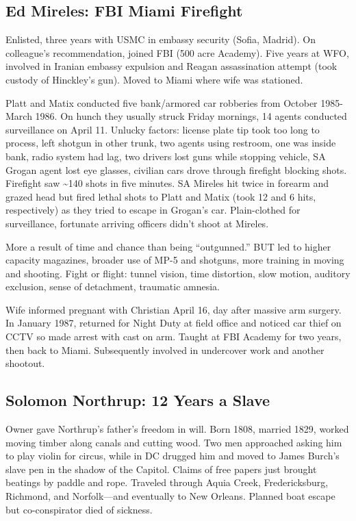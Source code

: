 \documentclass[
]{article}
\begin{document}
\hypertarget{ed-mireles-fbi-miami-firefight}{%
\subsection{Ed Mireles: FBI Miami
Firefight}\label{ed-mireles-fbi-miami-firefight}}

Enlisted, three years with USMC in embassy security (Sofia, Madrid). On
colleague's recommendation, joined FBI (500 acre Academy). Five years at
WFO, involved in Iranian embassy expulsion and Reagan assassination
attempt (took custody of Hinckley's gun). Moved to Miami where wife was
stationed.

Platt and Matix conducted five bank/armored car robberies from October
1985-March 1986. On hunch they usually struck Friday mornings, 14 agents
conducted surveillance on April 11. Unlucky factors: license plate tip
took too long to process, left shotgun in other trunk, two agents using
restroom, one was inside bank, radio system had lag, two drivers lost
guns while stopping vehicle, SA Grogan agent lost eye glasses, civilian
cars drove through firefight blocking shots. Firefight saw
\textasciitilde140 shots in five minutes. SA Mireles hit twice in
forearm and grazed head but fired lethal shots to Platt and Matix (took
12 and 6 hits, respectively) as they tried to escape in Grogan's car.
Plain-clothed for surveillance, fortunate arriving officers didn't shoot
at Mireles.

More a result of time and chance than being ``outgunned.'' BUT led to
higher capacity magazines, broader use of MP-5 and shotguns, more
training in moving and shooting. Fight or flight: tunnel vision, time
distortion, slow motion, auditory exclusion, sense of detachment,
traumatic amnesia.

Wife informed pregnant with Christian April 16, day after massive arm
surgery. In January 1987, returned for Night Duty at field office and
noticed car thief on CCTV so made arrest with cast on arm. Taught at FBI
Academy for two years, then back to Miami. Subsequently involved in
undercover work and another shootout.

\hypertarget{solomon-northrup-12-years-a-slave}{%
\subsection{Solomon Northrup: 12 Years a
Slave}\label{solomon-northrup-12-years-a-slave}}

Owner gave Northrup's father's freedom in will. Born 1808, married 1829,
worked moving timber along canals and cutting wood. Two men approached
asking him to play violin for circus, while in DC drugged him and moved
to James Burch's slave pen in the shadow of the Capitol. Claims of free
papers just brought beatings by paddle and rope. Traveled through Aquia
Creek, Fredericksburg, Richmond, and Norfolk---and eventually to New
Orleans. Planned boat escape but co-conspirator died of sickness.
\end{document}

